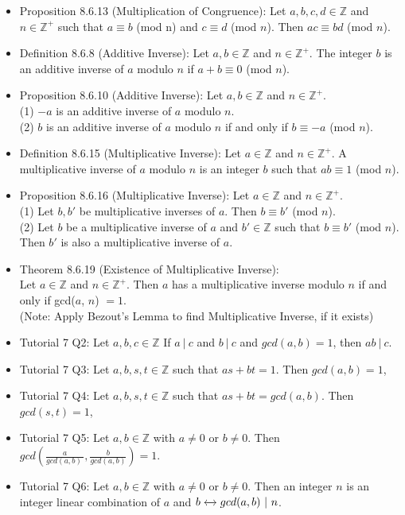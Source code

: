 \documentclass{article}
\begin{document}
\begin{itemize}
    \item Proposition 8.6.13 (Multiplication of Congruence): Let $a,b,c,d\in \mathbb{Z}$ and $n\in \mathbb{Z}^+$ such that $a\equiv b$ (mod n) and $c\equiv d$ (mod $n$). Then $ac\equiv bd$ (mod $n$).
    \item Definition 8.6.8 (Additive Inverse): Let $a,b\in \mathbb{Z}$ and $n\in \mathbb{Z}^+$. The integer $b$ is an additive inverse of $a$ modulo $n$ if $a+b\equiv 0$ (mod $n$).
    \item Proposition 8.6.10 (Additive Inverse): Let $a,b\in \mathbb{Z}$ and $n\in \mathbb{Z}^+$.
        \\ \hspace*{3mm} (1) $-a$ is an additive inverse of $a$ modulo $n$.
        \\ \hspace*{3mm} (2) $b$ is an additive inverse of $a$ modulo $n$ if and only if $b \equiv -a$ (mod $n$).
    \item Definition 8.6.15 (Multiplicative Inverse): Let $a\in \mathbb{Z}$ and $n\in \mathbb{Z}^+$. A multiplicative inverse of $a$ modulo $n$ is an integer $b$ such that $ab\equiv 1$ (mod $n$).
    \item Proposition 8.6.16 (Multiplicative Inverse): Let $a\in \mathbb{Z}$ and $n\in \mathbb{Z}^+$.
        \\ \hspace*{3mm} (1) Let $b,b'$ be multiplicative inverses of $a$. Then $b\equiv b'$ (mod $n$).
        \\ \hspace*{3mm} (2) Let $b$ be a multiplicative inverse of $a$ and $b'\in \mathbb{Z}$ such that $b\equiv b'$ (mod $n$). Then $b'$ is also a multiplicative \hspace*{10mm}inverse of $a$.
    \item Theorem 8.6.19 (Existence of Multiplicative Inverse):
        \\ Let $a\in \mathbb{Z}$ and $n\in \mathbb{Z}^+$. Then $a$ has a multiplicative inverse modulo $n$ if and only if gcd($a$, $n$) $=1$.
        \\ (Note: Apply Bezout's Lemma to find Multiplicative Inverse, if it exists)
    \item Tutorial 7 Q2: Let $a,b,c \in \mathbb{Z}$ If $a\ |\ c$ and $b\ |\ c$ and $gcd(a,b)=1$, then $ab\ |\ c$.
    \item Tutorial 7 Q3: Let $a,b,s,t \in \mathbb{Z}$ such that $as+bt=1$. Then $gcd(a,b)=1$,
    \item Tutorial 7 Q4: Let $a,b,s,t \in \mathbb{Z}$ such that $as+bt=gcd(a,b)$. Then $gcd(s,t)=1$,
    \item Tutorial 7 Q5: Let $a,b \in \mathbb{Z}$ with $a\neq0$ or $b\neq0$. Then $gcd \left(\frac{a}{gcd(a,b)~}, \frac{b}{gcd(a,b)}\right) = 1$.
    \item Tutorial 7 Q6: Let $a,b \in \mathbb{Z}$ with $a\neq0$ or $b\neq0$. Then an integer $n$ is an integer linear combination of $a$ and $b \xleftrightarrow{} gcd(a,b)\ |\ n$.
\end{itemize}
\end{document}
